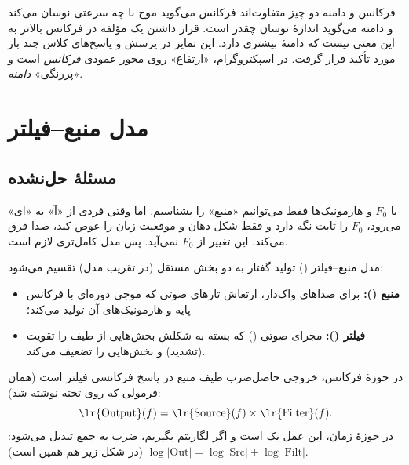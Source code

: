 \begin{warningbox}{فرکانس و دامنه دو چیز متفاوت‌اند}
فرکانس می‌گوید موج با چه سرعتی نوسان می‌کند و دامنه می‌گوید اندازهٔ نوسان چقدر است. قرار داشتن یک مؤلفه در فرکانس بالاتر به این معنی نیست که دامنهٔ بیشتری دارد. این تمایز در پرسش و پاسخ‌های کلاس چند بار مورد تأکید قرار گرفت. در اسپکتروگرام، «ارتفاع» روی محور عمودی \emph{فرکانس} است و «پررنگی» \emph{دامنه}.
\end{warningbox}

\section{مدل منبع--فیلتر}

\subsection{مسئلهٔ حل‌نشده}
با $F_0$ و هارمونیک‌ها فقط می‌توانیم «منبع» را بشناسیم. اما وقتی فردی از «آ» به «ای» می‌رود، $F_0$ را ثابت نگه دارد و فقط شکل دهان و موقعیت زبان را عوض کند، صدا فرق می‌کند. این تغییر از $F_0$ نمی‌آید. پس مدل کامل‌تری لازم است.

\begin{definitionbox}{مدل منبع--فیلتر ()}
تولید گفتار به دو بخش مستقل (در تقریب مدل) تقسیم می‌شود:
\begin{itemize}
  \item \textbf{منبع ():} برای صداهای واک‌دار، ارتعاش تارهای صوتی که موجی دوره‌ای با فرکانس پایه و هارمونیک‌های آن تولید می‌کند؛
  \item \textbf{فیلتر ():} مجرای صوتی () که بسته به شکلش بخش‌هایی از طیف را تقویت (تشدید) و بخش‌هایی را تضعیف می‌کند.
\end{itemize}
\end{definitionbox}

در حوزهٔ فرکانس، خروجی حاصل‌ضرب طیف منبع در پاسخ فرکانسی فیلتر است (همان فرمولی که روی تخته نوشته شد):
\[
\text{\lr{Output}}(f)=\text{\lr{Source}}(f)\times\text{\lr{Filter}}(f).
\]
در حوزهٔ زمان، این عمل یک  است و اگر لگاریتم بگیریم، ضرب به جمع تبدیل می‌شود: $\log|\text{Out}|=\log|\text{Src}|+\log|\text{Filt}|$ (در شکل زیر هم همین است).


